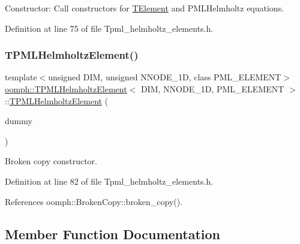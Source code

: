 Constructor\+: Call constructors for \hyperlink{classoomph_1_1TElement}{T\+Element} and P\+M\+L\+Helmholtz equations. 



Definition at line 75 of file Tpml\+\_\+helmholtz\+\_\+elements.\+h.

\mbox{\label{classoomph_1_1TPMLHelmholtzElement_a5637fe67c7d299b2d387c86b09464603}} 
\subsubsection{\texorpdfstring{T\+P\+M\+L\+Helmholtz\+Element()}{TPMLHelmholtzElement()}\hspace{0.1cm}{\footnotesize\ttfamily [2/2]}}
{\footnotesize\ttfamily template$<$unsigned D\+IM, unsigned N\+N\+O\+D\+E\+\_\+1D, class P\+M\+L\+\_\+\+E\+L\+E\+M\+E\+NT$>$ \\
\hyperlink{classoomph_1_1TPMLHelmholtzElement}{oomph\+::\+T\+P\+M\+L\+Helmholtz\+Element}$<$ D\+IM, N\+N\+O\+D\+E\+\_\+1D, P\+M\+L\+\_\+\+E\+L\+E\+M\+E\+NT $>$\+::\hyperlink{classoomph_1_1TPMLHelmholtzElement}{T\+P\+M\+L\+Helmholtz\+Element} (\begin{DoxyParamCaption}\item[{const \hyperlink{classoomph_1_1TPMLHelmholtzElement}{T\+P\+M\+L\+Helmholtz\+Element}$<$ D\+IM, N\+N\+O\+D\+E\+\_\+1D, P\+M\+L\+\_\+\+E\+L\+E\+M\+E\+NT $>$ \&}]{dummy }\end{DoxyParamCaption})\hspace{0.3cm}{\ttfamily [inline]}}



Broken copy constructor. 



Definition at line 82 of file Tpml\+\_\+helmholtz\+\_\+elements.\+h.



References oomph\+::\+Broken\+Copy\+::broken\+\_\+copy().



\subsection{Member Function Documentation}
\mbox{\label{classoomph_1_1TPMLHelmholtzElement_aef6adcd4002aa3fac6d5d45ac5ac779b}} 
